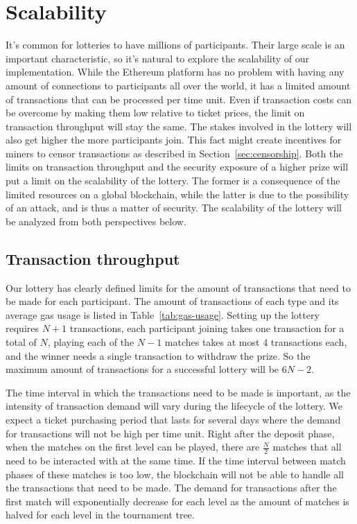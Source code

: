 \section{Scalability}
\label{sec:scalability}

It's common for lotteries to have millions of participants. Their large scale is an important characteristic, so it's natural to explore the scalability of our implementation. While the Ethereum platform has no problem with having any amount of connections to participants all over the world, it has a limited amount of transactions that can be processed per time unit. Even if transaction costs can be overcome by making them low relative to ticket prices, the limit on transaction throughput will stay the same. The stakes involved in the lottery will also get higher the more participants join. This fact might create incentives for miners to censor transactions as described in Section~\ref{sec:censorship}. 
Both the limits on transaction throughput and the security exposure of a higher prize will put a limit on the scalability of the lottery. The former is a consequence of the limited resources on a global blockchain, while the latter is due to the possibility of an attack, and is thus a matter of security. The scalability of the lottery will be analyzed from both perspectives below.

\subsection{Transaction throughput}

Our lottery has clearly defined limits for the amount of transactions that need to be made for each participant. The amount of transactions of each type and its average gas usage is listed in Table~\ref{tab:gas-usage}. Setting up the lottery requires $N+1$ transactions, each participant joining takes one transaction for a total of $N$, playing each of the $N-1$ matches takes at most $4$ transactions each, and the winner needs a single transaction to withdraw the prize. So the maximum amount of transactions for a successful lottery will be $6N-2$.  

The time interval in which the transactions need to be made is important, as the intensity of transaction demand will vary during the lifecycle of the lottery. We expect a ticket purchasing period that lasts for several days where the demand for transactions will not be high per time unit. Right after the deposit phase, when the matches on the first level can be played, there are $\frac{N}{2}$ matches that all need to be interacted with at the same time. If the time interval between match phases of these matches is too low, the blockchain will not be able to handle all the transactions that need to be made. The demand for transactions after the first match will exponentially decrease for each level as the amount of matches is halved for each level in the tournament tree.

